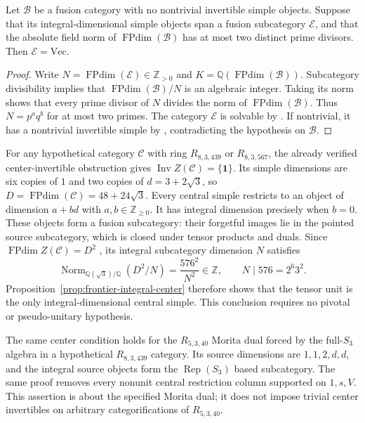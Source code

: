 \begin{proposition}
\label{prop:frontier-integral-center}
Let $\mathcal B$ be a fusion category with no nontrivial invertible simple
objects. Suppose that its integral-dimensional simple objects span a fusion
subcategory $\mathcal E$, and that the absolute field norm of
$\operatorname{FPdim}(\mathcal B)$ has at most two distinct prime divisors.
Then $\mathcal E=\mathrm{Vec}$.
\end{proposition}
\begin{proof}
Write $N=\operatorname{FPdim}(\mathcal E)\in\mathbb Z_{>0}$ and
$K=\mathbb Q(\operatorname{FPdim}(\mathcal B))$.
Subcategory divisibility \cite[Proposition~8.15]{ENO} implies that
$\operatorname{FPdim}(\mathcal B)/N$ is an algebraic integer.
Taking its norm shows that every prime divisor of $N$ divides the norm of
$\operatorname{FPdim}(\mathcal B)$. Thus $N=p^a q^b$ for at most two primes.
The category $\mathcal E$ is solvable by \cite[Theorem~1.6]{ENOSolvable}.
If nontrivial, it has a nontrivial invertible simple by
\cite[Proposition~4.5(iv)]{ENOSolvable}, contradicting the hypothesis on
$\mathcal B$.
\end{proof}

For any hypothetical category $\mathcal C$ with ring $R_{8,3,439}$ or
$R_{8,3,567}$, the already verified center-invertible obstruction gives
$\operatorname{Inv}Z(\mathcal C)=\{\mathbf1\}$.
Its simple dimensions are six copies of $1$ and two copies of
$d=3+2\sqrt3$, so $D=\operatorname{FPdim}(\mathcal C)=48+24\sqrt3$.
Every central simple restricts to an object of dimension $a+bd$ with
$a,b\in\mathbb Z_{\geq0}$. It has integral dimension precisely when $b=0$.
These objects form a fusion subcategory: their forgetful images lie in the
pointed source subcategory, which is closed under tensor products and duals.
Since $\operatorname{FPdim}Z(\mathcal C)=D^2$
\cite[Proposition~8.12]{ENO}, its integral subcategory dimension $N$ satisfies
\[
 \operatorname{Norm}_{\mathbb Q(\sqrt3)/\mathbb Q}(D^2/N)
 =\frac{576^2}{N^2}\in\mathbb Z,
 \qquad N\mid576=2^6 3^2.
\]
Proposition~\ref{prop:frontier-integral-center} therefore shows that the tensor
unit is the only integral-dimensional central simple. This conclusion requires
no pivotal or pseudo-unitary hypothesis.

The same center condition holds for the $R_{5,3,40}$ Morita dual forced by
the full-$S_3$ algebra in a hypothetical $R_{8,3,439}$ category. Its source
dimensions are $1,1,2,d,d$, and the integral source objects form the
$\operatorname{Rep}(S_3)$ based subcategory. The same proof removes every
nonunit central restriction column supported on $1,s,V$. This assertion is
about the specified Morita dual; it does not impose trivial center invertibles
on arbitrary categorifications of $R_{5,3,40}$.

